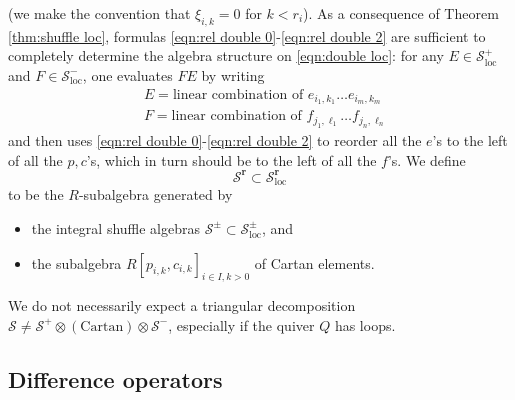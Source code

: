 \documentclass{amsart}
\def\CS{{\mathcal{S}}}
\def\br{{\mathbf{r}}}
\def\ring{R}
\begin{document}
(we make the convention that $\xi_{i,k} = 0$ for $k < r_i$). As a consequence of Theorem \ref{thm:shuffle loc}, formulas \eqref{eqn:rel double 0}-\eqref{eqn:rel double 2} are sufficient to completely determine the algebra structure on \eqref{eqn:double loc}: for any $E \in \CS^+_{\text{loc}}$ and $F \in \CS^-_{\text{loc}}$, one evaluates $FE$ by writing 
\begin{align*} 
&E = \text{linear combination of }e_{i_1,k_1} \dots e_{i_m,k_m} \\
&F = \text{linear combination of }f_{j_1,\ell_1}\dots f_{j_n,\ell_n}
\end{align*} 
and then uses \eqref{eqn:rel double 0}-\eqref{eqn:rel double 2} to reorder all the $e$'s to the left of all the $p,c$'s, which in turn should be to the left of all the $f$'s. We define 
\begin{equation}
\label{eqn:integral version}
\CS^{\br} \subset \CS^{\br}_{\text{loc}}
\end{equation}
to be the $\ring$-subalgebra generated by

\medskip 

\begin{itemize}[leftmargin=*]

\item the integral shuffle algebras $\CS^\pm \subset \CS^\pm_{\text{loc}}$, and 

\medskip 

\item the subalgebra $\ring [p_{i,k}, c_{i,k}]_{i \in I, k > 0}$ of Cartan elements.

\end{itemize}

\medskip 

\noindent We do not necessarily expect a triangular decomposition $\CS \neq \CS^+ \otimes (\text{Cartan}) \otimes \CS^-$, especially if the quiver $Q$ has loops.


\medskip

\subsection{Difference operators}
\label{sub:bfn}
\end{document}
